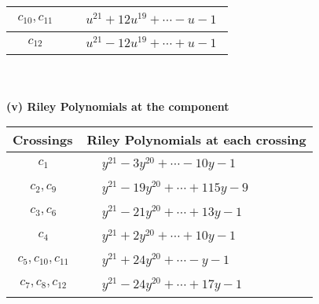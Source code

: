 \documentclass[1p]{elsarticle_modified}
\theoremstyle{definition}
\begin{document}
\begin{tabular}{m{50pt}|m{274pt}}
\hline $$\begin{aligned}c_{10},c_{11}\end{aligned}$$&$\begin{aligned}
&u^{21}+12 u^{19}+\cdots- u-1
\end{aligned}$\\
\hline $$\begin{aligned}c_{12}\end{aligned}$$&$\begin{aligned}
&u^{21}-12 u^{19}+\cdots+u-1
\end{aligned}$\\
\hline
\end{tabular}\\~\\
\newpage\renewcommand{\arraystretch}{1}
\flushleft \textbf{(v) Riley Polynomials at the component}\newline \\
\begin{tabular}{m{50pt}|m{274pt}}
Crossings & \hspace{64pt}Riley Polynomials at each crossing \\
\hline $$\begin{aligned}c_{1}\end{aligned}$$&$\begin{aligned}
&y^{21}-3 y^{20}+\cdots-10 y-1
\end{aligned}$\\
\hline $$\begin{aligned}c_{2},c_{9}\end{aligned}$$&$\begin{aligned}
&y^{21}-19 y^{20}+\cdots+115 y-9
\end{aligned}$\\
\hline $$\begin{aligned}c_{3},c_{6}\end{aligned}$$&$\begin{aligned}
&y^{21}-21 y^{20}+\cdots+13 y-1
\end{aligned}$\\
\hline $$\begin{aligned}c_{4}\end{aligned}$$&$\begin{aligned}
&y^{21}+2 y^{20}+\cdots+10 y-1
\end{aligned}$\\
\hline $$\begin{aligned}c_{5},c_{10},c_{11}\end{aligned}$$&$\begin{aligned}
&y^{21}+24 y^{20}+\cdots- y-1
\end{aligned}$\\
\hline $$\begin{aligned}c_{7},c_{8},c_{12}\end{aligned}$$&$\begin{aligned}
&y^{21}-24 y^{20}+\cdots+17 y-1
\end{aligned}$\\
\hline
\end{tabular}\\~\\
\end{document}
